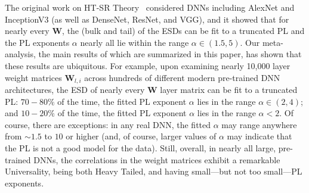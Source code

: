 The original work on HT-SR Theory~\cite{MM18_TR,MM19_HTSR_ICML,MM20_SDM} considered DNNs including AlexNet and InceptionV3 (as well as DenseNet, ResNet, and VGG), and it showed that for nearly every $\mathbf{W}$, the (bulk and tail) of the ESDs can be fit to a truncated PL and the PL exponents $\alpha$ nearly all lie within the range $\alpha\in(1.5,5)$.
Our meta-analysis, the main results of which are summarized in this paper, has shown that these results are ubiquitous.
For example, 
upon examining nearly 10,000 layer weight matrices $\mathbf{W}_{l,i}$ across hundreds of different modern pre-trained DNN architectures, the ESD of nearly every $\mathbf{W}$ layer matrix can be fit to a truncated PL:
$70-80\%$ of the time, the fitted PL exponent $\alpha$ lies in the range $\alpha\in(2,4)$; and  
$10-20\%$ of the time, the fitted PL exponent $\alpha$ lies in the range $\alpha< 2$.  
Of course, there are exceptions: in any real DNN, the fitted $\alpha$ may range anywhere from $\sim 1.5$ to $10$ or higher (and, of course, larger values of $\alpha$ may indicate that the PL is not a good model for the data).  
Still, overall, in nearly all large, pre-trained DNNs, the correlations in the  weight matrices exhibit a remarkable Universality, being both Heavy Tailed, and having small---but not too small---PL exponents. 

